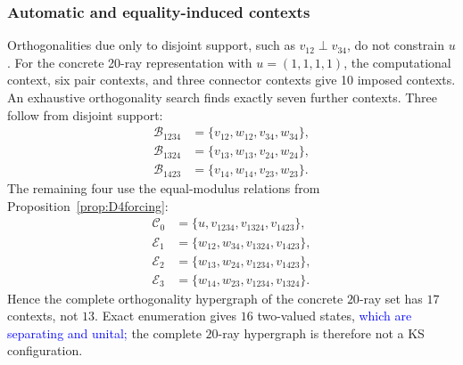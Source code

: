 \documentclass[%
  reprint,
  superscriptaddress,
  showkeys,
  amsmath,amssymb,
  aps,pra,
  longbibliography,
  floatfix,
  x11names
]{revtex4-2}
\DeclareRobustCommand{\chg}[1]{\textcolor{blue}{#1}}
\begin{document}
\subsubsection{Automatic and equality-induced contexts}
Orthogonalities due only to disjoint support, such as $v_{12}\perp v_{34}$, do not constrain $u$.  For the concrete 20-ray representation with $u=(1,1,1,1)$, the computational context, six pair contexts, and three connector contexts give 10 imposed contexts.  An exhaustive orthogonality search finds exactly seven further contexts.  Three follow from disjoint support:
\begin{align*}
\mathcal{B}_{1234}&=\{v_{12},w_{12},v_{34},w_{34}\},\\
\mathcal{B}_{1324}&=\{v_{13},w_{13},v_{24},w_{24}\},\\
\mathcal{B}_{1423}&=\{v_{14},w_{14},v_{23},w_{23}\}.
\end{align*}
The remaining four use the equal-modulus relations from Proposition~\ref{prop:D4forcing}:
\begin{align*}
\mathcal{C}_0&=\{u,v_{1234},v_{1324},v_{1423}\},\\
\mathcal{E}_1&=\{w_{12},w_{34},v_{1324},v_{1423}\},\\
\mathcal{E}_2&=\{w_{13},w_{24},v_{1234},v_{1423}\},\\
\mathcal{E}_3&=\{w_{14},w_{23},v_{1234},v_{1324}\}.
\end{align*}
Hence the complete orthogonality hypergraph of the concrete $20$-ray set has $17$ contexts, not $13$.  Exact enumeration gives $16$ two-valued states, \chg{which are separating and unital;} the complete $20$-ray hypergraph is therefore not a KS configuration.
\end{document}
